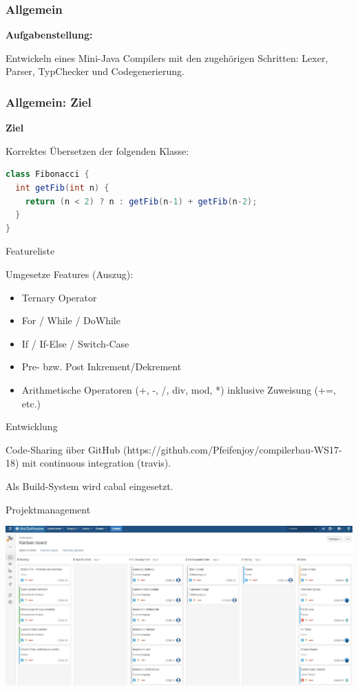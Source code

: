 \begin{frame}
	\frametitle{Allgemein}
	
\textbf{Aufgabenstellung:}

Entwickeln eines Mini-Java Compilers mit den zugehörigen Schritten: Lexer, Parser, TypChecker und Codegenerierung.
\end{frame}

\begin{frame}[fragile]
\frametitle{Allgemein: Ziel}

\textbf{Ziel} 

Korrektes Übersetzen der folgenden Klasse:

\begin{lstlisting}[language=Java]
class Fibonacci {
  int getFib(int n) {
    return (n < 2) ? n : getFib(n-1) + getFib(n-2);
  }
}
\end{lstlisting}	
\end{frame}



\begin{frame}{Featureliste}

Umgesetze Features (Auszug):

\begin{itemize}
	\item Ternary Operator
	\item For / While / DoWhile 
	\item If / If-Else / Switch-Case
	\item Pre- bzw. Post Inkrement/Dekrement
	\item Arithmetische Operatoren (+, -, /, div, mod, *) inklusive Zuweisung (+=, etc.)
\end{itemize}	
\end{frame}

\begin{frame}{Entwicklung}

Code-Sharing über GitHub (https://github.com/Pfeifenjoy/compilerbau-WS17-18) mit continuous integration (travis).

\par \medskip

Als Build-System wird cabal eingesetzt.	
\end{frame}

\begin{frame}{Projektmanagement}

\includegraphics[scale=0.25]{images/allgemein/jira.jpg}

\end{frame}

